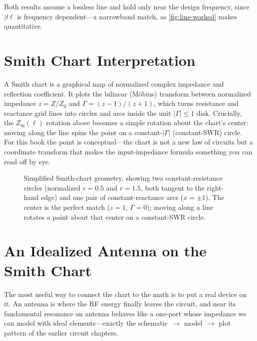 Both results assume a lossless line and hold only near the design frequency, since
\(\beta\ell\) is frequency dependent---a narrowband match, as
\cref{fig:line-worked} makes quantitative.

\section{Smith Chart Interpretation}
A Smith chart is a graphical map of normalized complex impedance and reflection
coefficient. It plots the bilinear (M\"obius) transform between normalized
impedance \(z=Z/Z_0\) and \(\Gamma=(z-1)/(z+1)\), which turns resistance and
reactance grid lines into circles and arcs inside the unit \(|\Gamma|\le1\) disk.
Crucially, the \(Z_{\mathrm{in}}(\ell)\) rotation above becomes a simple rotation
about the chart's center: moving along the line spins the point on a
constant-\(|\Gamma|\) (constant-SWR) circle. For this book the point is
conceptual---the chart is not a new law of circuits but a coordinate transform
that makes the input-impedance formula something you can read off by eye.

\begin{figure}[htbp]
\centering
{}
\caption{Simplified Smith-chart geometry, showing two constant-resistance circles
(normalized \(r=0.5\) and \(r=1.5\), both tangent to the right-hand edge) and one pair
of constant-reactance arcs (\(x=\pm1\)). The center is the perfect match
(\(z=1\), \(\Gamma=0\)); moving along a line rotates a point about that center on a
constant-SWR circle.}
\label{fig:smith-basic}
\end{figure}

\section{An Idealized Antenna on the Smith Chart}
The most useful way to connect the chart to the math is to put a real device on
it. An antenna is where the RF energy finally leaves the circuit, and near its
fundamental resonance an antenna behaves like a one-port whose impedance we can
model with ideal elements---exactly the schematic~\(\to\) model~\(\to\) plot
pattern of the earlier circuit chapters.

